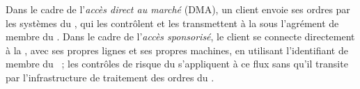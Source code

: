 \begin{definition}\label{def:m1:exchanges-brokers-venues:dma}
Dans le cadre de l'\emph{accès direct au marché} (DMA),
un client envoie ses ordres par les systèmes du , qui les contrôlent et
les transmettent à la  sous l'agrément de membre du . Dans le cadre de
l'\emph{accès sponsorisé}, le client se connecte directement à la ,
avec ses propres lignes et ses propres machines, en utilisant l'identifiant de membre
du ~; les contrôles de risque du  s'appliquent à ce flux sans qu'il transite
par l'infrastructure de traitement des ordres du .
\end{definition}

